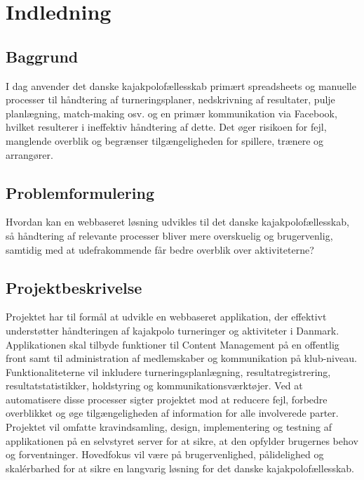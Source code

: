 \section{Indledning}
\subsection{Baggrund}
I dag anvender det danske kajakpolofællesskab primært spreadsheets og manuelle processer til håndtering af
turneringsplaner, nedskrivning af resultater, pulje planlægning, match-making osv. og en primær
kommunikation via Facebook, hvilket resulterer i ineffektiv håndtering af dette. Det øger risikoen
for fejl, manglende overblik og begrænser tilgængeligheden for spillere, trænere og arrangører.

\subsection{Problemformulering}
Hvordan kan en webbaseret løsning udvikles til det danske kajakpolofællesskab, så håndtering af relevante processer
bliver mere overskuelig og brugervenlig, samtidig med at udefrakommende får bedre overblik over aktiviteterne?

\subsection{Projektbeskrivelse}
Projektet har til formål at udvikle en webbaseret applikation, der effektivt understøtter
håndteringen af kajakpolo turneringer og aktiviteter i Danmark.
Applikationen skal tilbyde funktioner til Content Management på en offentlig front samt til administration af
medlemskaber og kommunikation på klub-niveau.
Funktionaliteterne vil inkludere turneringsplanlægning, resultatregistrering, resultatstatistikker, holdstyring og
kommunikationsværktøjer.
Ved at automatisere disse processer sigter projektet mod at reducere fejl, forbedre overblikket og øge tilgængeligheden
af information for alle involverede parter.
Projektet vil omfatte kravindsamling, design, implementering og testning af applikationen på en selvstyret server for
at sikre, at den opfylder brugernes behov og forventninger.
Hovedfokus vil være på brugervenlighed, pålidelighed og skalérbarhed for at sikre en langvarig løsning for det danske
kajakpolofællesskab.



